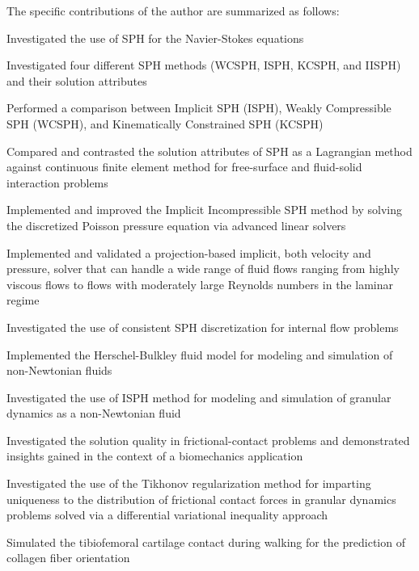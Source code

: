 The specific contributions of the author are summarized as follows:
\begin{compactitem} 
	\item Investigated the use of SPH for the Navier-Stokes equations
	\begin{compactitem} 
		\item Investigated four different SPH methods (WCSPH, ISPH, KCSPH, and IISPH) and  their solution attributes
		\item Performed a comparison between Implicit SPH (ISPH), Weakly Compressible SPH (WCSPH), and Kinematically Constrained SPH (KCSPH)
		\item Compared and contrasted the solution attributes of SPH as a Lagrangian method against continuous finite element method for free-surface and fluid-solid interaction problems 
		\item Implemented and improved the Implicit Incompressible SPH \cite{ihmsen2014implicit} method by solving the discretized Poisson pressure equation via advanced linear solvers
		\item Implemented and validated a projection-based implicit, both velocity and pressure, solver that can handle a wide range of fluid flows ranging from highly viscous flows to flows with moderately large Reynolds numbers in the laminar regime
		\item Investigated the use of consistent SPH discretization for internal flow problems
		\item Implemented the Herschel-Bulkley fluid model for modeling and simulation of non-Newtonian fluids
		\item Investigated the use of ISPH method for modeling and simulation of granular dynamics as a non-Newtonian fluid 
	\end{compactitem}
	
	
	\item Investigated the solution quality in frictional-contact problems and demonstrated insights gained in the context of a biomechanics application 
	\begin{compactitem} 
		\item  Investigated the use of the Tikhonov regularization method for imparting uniqueness to the distribution of frictional contact forces in granular dynamics problems solved via a differential variational inequality approach
		\item Simulated the tibiofemoral cartilage contact during walking for the prediction of collagen fiber orientation
	\end{compactitem}
	

\end{compactitem}
